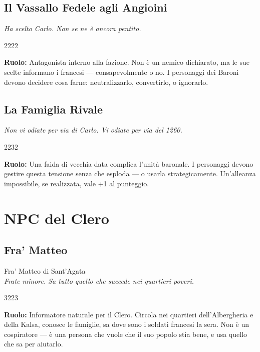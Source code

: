 \filetto

\subsection{Il Vassallo Fedele agli Angioini}
\textit{Ha scelto Carlo. Non se ne è ancora pentito.}

%
{2}{2}{2}{2}

\textbf{Ruolo:} Antagonista interno alla fazione. Non è un nemico
dichiarato, ma le sue scelte informano i francesi — consapevolmente
o no. I personaggi dei Baroni devono decidere cosa farne: neutralizzarlo,
convertirlo, o ignorarlo.

\subsection{La Famiglia Rivale}
\textit{Non vi odiate per via di Carlo. Vi odiate per via del 1260.}

%
{2}{2}{3}{2}

\textbf{Ruolo:} Una faida di vecchia data complica l'unità baronale.
I personaggi devono gestire questa tensione senza che esploda —
o usarla strategicamente. Un'alleanza impossibile, se realizzata,
vale +1 al punteggio.

\secsep

\section{NPC del Clero}

\subsection{Fra' Matteo}
{\cinzel\footnotesize\color{grigionote} Fra' Matteo di Sant'Agata}\\
\textit{Frate minore. Sa tutto quello che succede nei quartieri poveri.}

%
{3}{2}{2}{3}

\textbf{Ruolo:} Informatore naturale per il Clero. Circola nei
quartieri dell'Albergheria e della Kalsa, conosce le famiglie,
sa dove sono i soldati francesi la sera. Non è un cospiratore —
è una persona che vuole che il suo popolo stia bene, e usa quello
che sa per aiutarlo.

